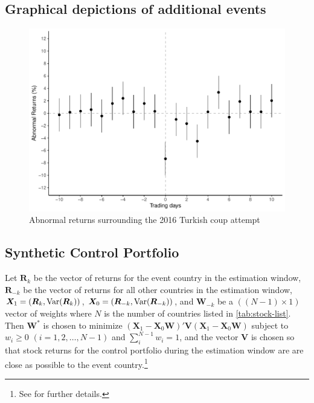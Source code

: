\documentclass[12pt,final,fleqn]{article}
\theoremstyle{plain}
\newcommand\var{{\rm Var}}
\begin{document}
\clearpage
\pagebreak

\subsection{Graphical depictions of additional events}



\begin{figure}[!htb]
\centering
\includegraphics[scale=0.75]{../figs/turkey_coup_attempt_2016.pdf}
\caption{Abnormal returns surrounding the 2016 Turkish coup attempt}
\label{fig:AR-Turkey-2016}
\end{figure}


\pagebreak

\subsection{Synthetic Control Portfolio}\label{synthetic}
Let $\boldsymbol{R}_{k}$ be the vector of returns for the event country in the estimation window, $\boldsymbol{R}_{-k}$ be the vector of returns for all other countries in the estimation window, $\boldsymbol{X}_1=(\boldsymbol{R}_{k},\var(\boldsymbol{R}_{k}))$, $\boldsymbol{X}_0=(\boldsymbol{R}_{-k},\var(\boldsymbol{R}_{-k}))$, and $\boldsymbol{W}_{-k}$ be a $((N-1) \times 1)$ vector of weights where $N$ is the number of countries listed in \autoref{tab:stock-list}. Then $\boldsymbol{W}^*$ is chosen to minimize $(\boldsymbol{X}_1-\boldsymbol{X}_0\boldsymbol{W})'\boldsymbol{V}(\boldsymbol{X}_1-\boldsymbol{X}_0\boldsymbol{W})$ subject to $w_i\geq0$ $(i = 1,2,\ldots,N-1)$ and $\sum_i^{N-1} w_i = 1$, and the vector $\boldsymbol{V}$ is chosen so that stock returns for the control portfolio during the estimation window are are close as possible to the event country.\footnote{See \citet{abadie2003economic} for further details.}


\clearpage
\pagebreak
\end{document}
